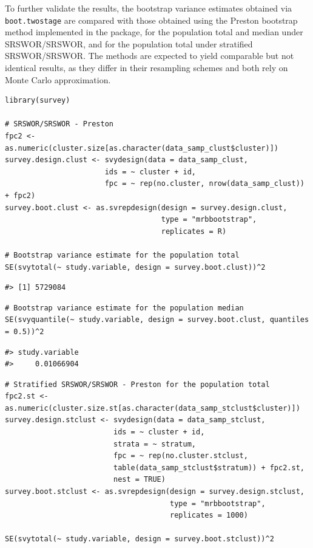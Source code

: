 To further validate the results, the bootstrap variance estimates obtained via \texttt{boot.twostage} are compared with those obtained using the Preston bootstrap method implemented in the  package, for the population total and median under SRSWOR/SRSWOR, and for the population total under stratified SRSWOR/SRSWOR. The methods are expected to yield comparable but not identical results, as they differ in their resampling schemes and both rely on Monte Carlo approximation.

\begin{verbatim}
library(survey)

# SRSWOR/SRSWOR - Preston
fpc2 <- as.numeric(cluster.size[as.character(data_samp_clust$cluster)])
survey.design.clust <- svydesign(data = data_samp_clust,
                       ids = ~ cluster + id,
                       fpc = ~ rep(no.cluster, nrow(data_samp_clust)) + fpc2)
survey.boot.clust <- as.svrepdesign(design = survey.design.clust,
                                    type = "mrbbootstrap",
                                    replicates = R)

# Bootstrap variance estimate for the population total
SE(svytotal(~ study.variable, design = survey.boot.clust))^2
\end{verbatim}

\begin{verbatim}
#> [1] 5729084
\end{verbatim}

\begin{verbatim}
# Bootstrap variance estimate for the population median
SE(svyquantile(~ study.variable, design = survey.boot.clust, quantiles = 0.5))^2
\end{verbatim}

\begin{verbatim}
#> study.variable 
#>     0.01066904
\end{verbatim}

\begin{verbatim}
# Stratified SRSWOR/SRSWOR - Preston for the population total
fpc2.st <- as.numeric(cluster.size.st[as.character(data_samp_stclust$cluster)])
survey.design.stclust <- svydesign(data = data_samp_stclust,
                         ids = ~ cluster + id,
                         strata = ~ stratum,
                         fpc = ~ rep(no.cluster.stclust, 
                         table(data_samp_stclust$stratum)) + fpc2.st,
                         nest = TRUE)
survey.boot.stclust <- as.svrepdesign(design = survey.design.stclust,
                                      type = "mrbbootstrap",
                                      replicates = 1000)

SE(svytotal(~ study.variable, design = survey.boot.stclust))^2
\end{verbatim}

